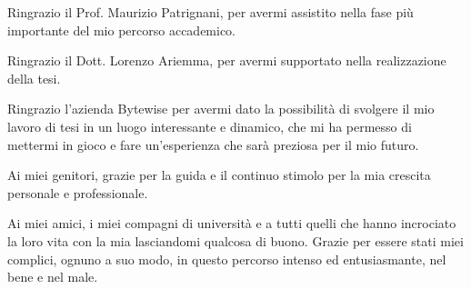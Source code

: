 Ringrazio il Prof. Maurizio Patrignani, per avermi assistito nella fase più importante del mio percorso accademico.

Ringrazio il Dott. Lorenzo Ariemma, per avermi supportato nella realizzazione della tesi.

Ringrazio l'azienda Bytewise per avermi dato la possibilità di svolgere il mio lavoro di tesi in un luogo interessante e dinamico, che mi ha permesso di mettermi in gioco e fare un'esperienza che sarà preziosa per il mio futuro.

Ai miei genitori, grazie per la guida e il continuo stimolo per la mia crescita personale e professionale.

Ai miei amici, i miei compagni di università e a tutti quelli che hanno incrociato la loro vita con la mia lasciandomi qualcosa di buono. Grazie per essere stati miei complici, ognuno a suo modo, in questo percorso intenso ed entusiasmante, nel bene e nel male.

